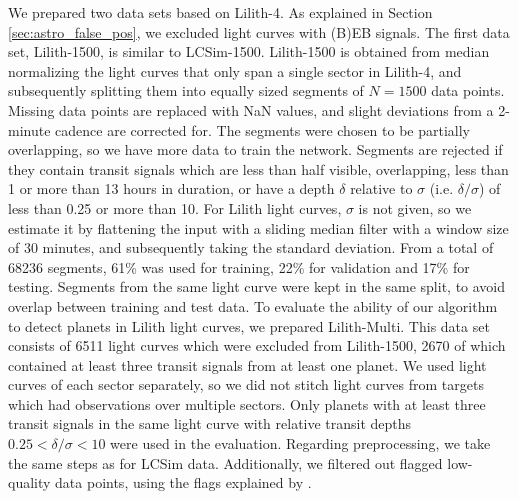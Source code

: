 We prepared two data sets based on Lilith-4. As explained in Section \ref{sec:astro_false_pos}, we excluded light curves with (B)EB signals. The first data set, Lilith-1500, is similar to LCSim-1500. Lilith-1500 is obtained from median normalizing the light curves that only span a single sector in Lilith-4, and subsequently splitting them into equally sized segments of $N=1500$ data points. Missing data points are replaced with NaN values, and slight deviations from a 2-minute cadence are corrected for. The segments were chosen to be partially overlapping, so we have more data to train the network. Segments are rejected if they contain transit signals which are less than half visible, overlapping, less than 1 or more than 13 hours in duration, or have a depth $\delta$ relative to $\sigma$ (i.e. $\delta/\sigma$) of less than 0.25 or more than 10. For Lilith light curves, $\sigma$  is not given, so we estimate it by flattening the input with a sliding median filter with a window size of 30 minutes, and subsequently taking the standard deviation. From a total of 68236 segments, 61\% was used for training, 22\% for validation and 17\% for testing. Segments from the same light curve were kept in the same split, to avoid overlap between training and test data. To evaluate the ability of our algorithm to detect planets in Lilith light curves, we prepared Lilith-Multi. This data set consists of 6511 light curves which were excluded from Lilith-1500, 2670 of which contained at least three transit signals from at least one planet. We used light curves of each sector separately, so we did not stitch light curves from targets which had observations over multiple sectors. Only planets with at least three transit signals in the same light curve with relative transit depths $0.25 < \delta/\sigma < 10$ were used in the evaluation. Regarding preprocessing, we take the same steps as for LCSim data. Additionally, we filtered out flagged low-quality data points, using the flags explained by \cite{tenenbaum2018tess}.

